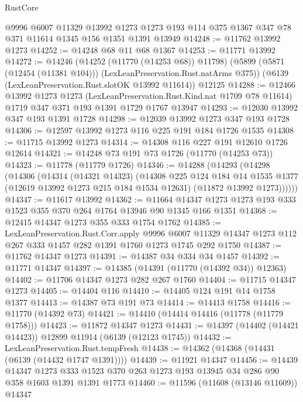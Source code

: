 \begin{lexlean}{RustCore}
\begin{coremodule}
    @9996
    @6007
    @11329
    @13992
    @1273
    @1273
    @193
    @114
    @375
    @1367
    @347
    @78
    @371
    @11614
    @1345
    @156
    @1351
    @1391
    @13949
@14248 := @11762 @13992 @1273
@14252 := @14248 @68 @11 @68 @1367
@14253 := @11771 @13992
@14272 := @14246
    (@14252 (@11770 (@14253 @68)) @11798)
    (@5899 (@5871 (@12454 (@11381 @104))) (LexLeanPreservation.Rust.natArms @375))
    (@6139 (LexLeanPreservation.Rust.slotOK @13992 @11614))
    @12125
@14288 := @12466
    @13992
    @1273
    @1273
    (LexLeanPreservation.Rust.Kind.nat @1709 @78 @11614)
    @1719
    @347
    @371
    @193
    @1391
    @1729
    @1767
    @13947
@14293 := @12030 @13992 @347 @193 @1391 @1728
@14298 := @12039 @13992 @1273 @347 @193 @1728
@14306 := @12597 @13992 @1273 @116 @225 @191 @184 @1726 @1535
@14308 := @11715 @13992 @1273
@14314 := @14308 @116 @227 @191 @12610 @1726 @12614
@14321 := @14248 @73 @191 @73 @1726 (@11770 (@14253 @73))
@14323 := @11778 (@11779 @1726)
@14346 := @14288
    (@14293
      (@14298
        (@14306
          (@14314
            (@14321 @14323)
            (@14308
              @225
              @124
              @184
              @14
              @1535
              @1377
              (@12619 @13992 @1273 @215 @184 @1534 @12631)
              (@11872 @13992 @1273))))))
@14347 := @11617 @13992
@14362 := @11664 @14347 @1273 @1273 @193 @333 @1523 @355 @370 @264 @1764 @13946 @90 @1345 @166 @1351
@14368 := @12415 @14347 @1273 @355 @333 @1754 @1762
@14385 := LexLeanPreservation.Rust.Corr.apply
    @9996
    @6007
    @11329
    @14347
    @1273
    @112
    @267
    @333
    @1457
    @282
    @1391
    @1760
    @1273
    @1745
    @292
    @1750
@14387 := @11762 @14347 @1273
@14391 := @14387 @34 @334 @34 @1457
@14392 := @11771 @14347
@14397 := @14385 (@14391 (@11770 (@14392 @34)) @12363)
@14402 := @11706 @14347 @1273 @282 @267 @1760
@14404 := @11715 @14347 @1273
@14405 := @14404 @116
@14410 := @14405 @124 @191 @14 @1758 @1377
@14413 := @14387 @73 @191 @73
@14414 := @14413 @1758
@14416 := @11770 (@14392 @73)
@14421 := @14410 (@14414 @14416 (@11778 (@11779 @1758)))
@14423 := @11872 @14347 @1273
@14431 := @14397 (@14402 (@14421 @14423)) @12899 @11914 (@6139 (@12123 @1745))
@14432 := LexLeanPreservation.Rust.tempFresh
@14438 := @14362 (@14368 (@14431 (@6139 (@14432 @1747 @1391))))
@14439 := @11921 @14347
@14456 := @14439
    @14347
    @1273
    @333
    @1523
    @370
    @263
    @1273
    @193
    @13945
    @34
    @286
    @90
    @358
    @1603
    @1391
    @1391
    @1773
@14460 := @11596 (@11608 (@13146 @11609)) @14347

\end{coremodule}
\end{lexlean}
